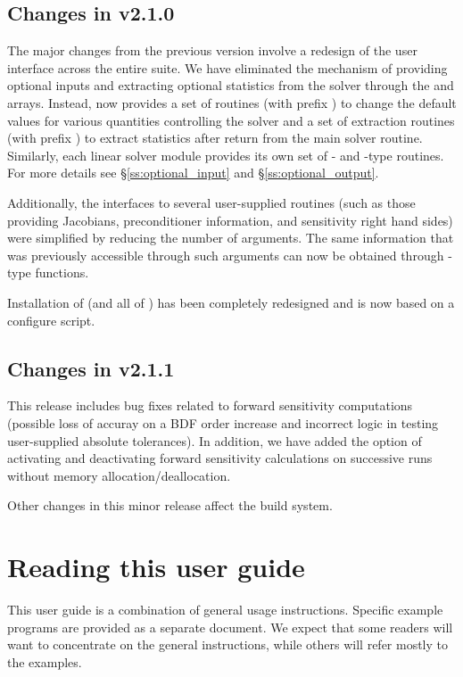\subsection*{Changes in v2.1.0}

The major changes from the previous version involve a redesign of the
user interface across the entire {\sundials} suite. We have eliminated the
mechanism of providing optional inputs and extracting optional statistics 
from the solver through the  and  arrays. Instead,
{\cvodes} now provides a set of routines (with prefix )
to change the default values for various quantities controlling the
solver and a set of extraction routines (with prefix )
to extract statistics after return from the main solver routine.
Similarly, each linear solver module provides its own set of {-}
and {-type} routines. For more details see \S\ref{ss:optional_input}
and \S\ref{ss:optional_output}.

Additionally, the interfaces to several user-supplied routines
(such as those providing Jacobians, preconditioner information, and
sensitivity right hand sides) were simplified by reducing the number
of arguments. The same information that was previously accessible
through such arguments can now be obtained through {-type}
functions.

Installation of {\cvodes} (and all of {\sundials}) has been completely 
redesigned and is now based on a configure script.

\subsection*{Changes in v2.1.1}

This {\cvodes} release includes bug fixes related to forward sensitivity
computations (possible loss of accuray on a BDF order increase and incorrect
logic in testing user-supplied absolute tolerances). 
In addition, we have added the option of activating and deactivating
forward sensitivity calculations on successive {\cvodes} runs without memory
allocation/deallocation.

Other changes in this minor {\sundials} release affect the build system.


\section{Reading this user guide}\label{ss:reading}

This user guide is a combination of general usage instructions.
Specific example programs are provided as a separate document.
We expect that some readers will want to concentrate on the general 
instructions, while others will refer mostly to the examples.

